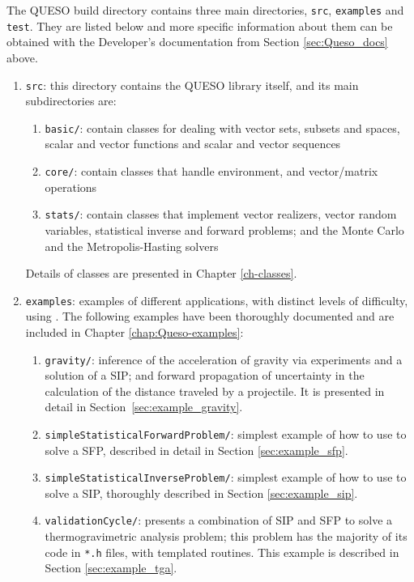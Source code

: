 The QUESO build directory contains three main directories, \texttt{src}, \texttt{examples} and \texttt{test}. They are listed below and more specific
information about them can be obtained with the Developer's documentation from Section \ref{sec:Queso_docs} above.
\begin{enumerate}
\item \texttt{src}: this directory contains the QUESO library itself, and its main subdirectories are:
  \begin{enumerate}
  \item \texttt{basic/}: contain classes for dealing with vector sets, subsets and spaces, scalar and vector functions and scalar and vector sequences
  \item \texttt{core/}: contain classes that handle \Queso{} environment, and vector/matrix operations
  \item \texttt{stats/}: contain classes that implement vector realizers, vector random variables, statistical inverse and forward problems; and the Monte Carlo and the Metropolis-Hasting solvers
  \end{enumerate}
  
Details of \Queso{}  classes are presented in Chapter \ref{ch-classes}.

\item \texttt{examples}:  examples of different applications, with distinct levels of difficulty, using \Queso{}. The following examples have been thoroughly documented and are included in Chapter \ref{chap:Queso-examples}:
\begin{enumerate}
\item \texttt{gravity/}: inference of the acceleration of gravity via experiments and a solution of a SIP; and forward propagation of uncertainty in the calculation of the distance traveled by a projectile. It is presented in detail in Section~\ref{sec:example_gravity}.


\item \texttt{simpleStatisticalForwardProblem/}: simplest example of how to use \Queso{} to solve a SFP, described in detail in Section \ref{sec:example_sfp}.

\item \texttt{simpleStatisticalInverseProblem/}: simplest example of how to use \Queso{} to solve a SIP, thoroughly described in Section \ref{sec:example_sip}.

\item \texttt{validationCycle/}: presents a combination of SIP and SFP to solve a thermogravimetric analysis problem; this problem has the majority of its code in \verb+*.h+ files, with templated routines. This example is described in Section \ref{sec:example_tga}.


\end{enumerate}
\end{enumerate}
